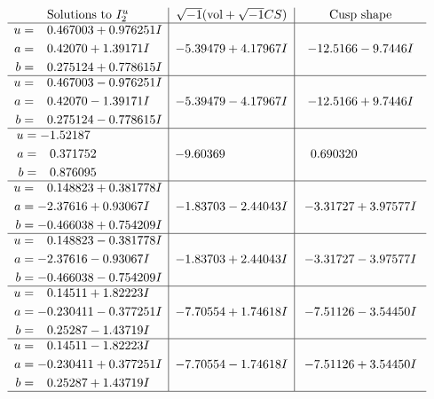 \documentclass[1p]{elsarticle_modified}
\theoremstyle{definition}
\newcommand{\I}{\sqrt{-1}}
\begin{document}
$$\begin{array}{c|c|c}  
\text{Solutions to }I^u_{2}& \I (\text{vol} + \sqrt{-1}CS) & \text{Cusp shape}\\
 \hline 
\begin{aligned}
u &= \phantom{-}0.467003 + 0.976251 I \\
a &= \phantom{-}0.42070 + 1.39171 I \\
b &= \phantom{-}0.275124 + 0.778615 I\end{aligned}
 & -5.39479 + 4.17967 I & -12.5166 - 9.7446 I \\ \hline\begin{aligned}
u &= \phantom{-}0.467003 - 0.976251 I \\
a &= \phantom{-}0.42070 - 1.39171 I \\
b &= \phantom{-}0.275124 - 0.778615 I\end{aligned}
 & -5.39479 - 4.17967 I & -12.5166 + 9.7446 I \\ \hline\begin{aligned}
u &= -1.52187\phantom{ +0.000000I} \\
a &= \phantom{-}0.371752\phantom{ +0.000000I} \\
b &= \phantom{-}0.876095\phantom{ +0.000000I}\end{aligned}
 & -9.60369\phantom{ +0.000000I} & \phantom{-}0.690320\phantom{ +0.000000I} \\ \hline\begin{aligned}
u &= \phantom{-}0.148823 + 0.381778 I \\
a &= -2.37616 + 0.93067 I \\
b &= -0.466038 + 0.754209 I\end{aligned}
 & -1.83703 - 2.44043 I & -3.31727 + 3.97577 I \\ \hline\begin{aligned}
u &= \phantom{-}0.148823 - 0.381778 I \\
a &= -2.37616 - 0.93067 I \\
b &= -0.466038 - 0.754209 I\end{aligned}
 & -1.83703 + 2.44043 I & -3.31727 - 3.97577 I \\ \hline\begin{aligned}
u &= \phantom{-}0.14511 + 1.82223 I \\
a &= -0.230411 - 0.377251 I \\
b &= \phantom{-}0.25287 - 1.43719 I\end{aligned}
 & -7.70554 + 1.74618 I & -7.51126 - 3.54450 I \\ \hline\begin{aligned}
u &= \phantom{-}0.14511 - 1.82223 I \\
a &= -0.230411 + 0.377251 I \\
b &= \phantom{-}0.25287 + 1.43719 I\end{aligned}
 & -7.70554 - 1.74618 I & -7.51126 + 3.54450 I\\
 \hline 
 \end{array}$$\newpage
\end{document}
